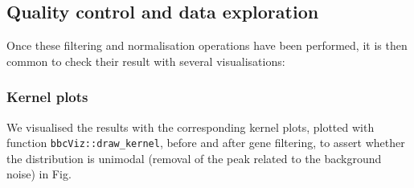 \begin{Shaded}
\begin{Highlighting}[]
\OtherTok{\textless{}{-}}\SpecialCharTok{::}\NormalTok{(}
  \SpecialCharTok{::}
  \SpecialCharTok{::}
   \SpecialCharTok{\textasciitilde{}}  \SpecialCharTok{+}

\OtherTok{\textless{}{-}}\SpecialCharTok{::}\SpecialCharTok{\%\textgreater{}\%}\SpecialCharTok{::}\NormalTok{(}

\OtherTok{\textless{}{-}}\SpecialCharTok{::}\NormalTok{(}
\end{Highlighting}
\end{Shaded}


\subsection{Quality control and data exploration} 
\label{quality-control-and-data-exploration}

Once these filtering and normalisation operations have been performed, it is then common to check their result with several visualisations:


\subsubsection{Kernel plots} 
\label{subsec:kernel-plot}

We visualised the results with the corresponding kernel plots, plotted with function \texttt{bbcViz::draw\_kernel}, before and after gene filtering, to assert whether the distribution is unimodal (removal of the peak related to the background noise) in Fig. 

